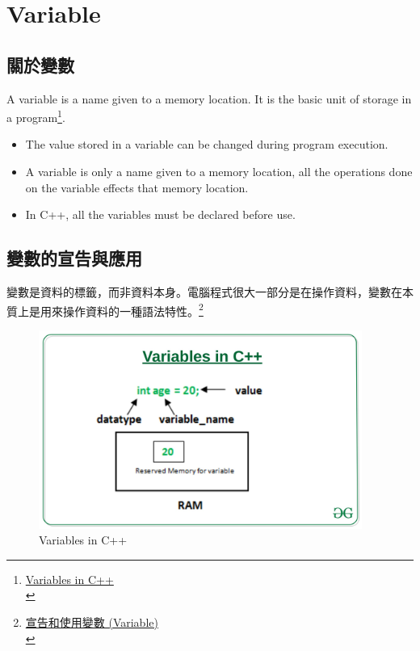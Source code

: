 \documentclass[a4paper,12pt]{article}
\begin{document}
\section{Variable}
\label{cpp_variables}
\subsection{關於變數}
\label{sec:org0c794d3}
A variable is a name given to a memory location. It is the basic unit of storage in a program\footnote{\href{https://www.geeksforgeeks.org/variables-in-c/}{Variables in C++}\\}.\\
\begin{itemize}
\item The value stored in a variable can be changed during program execution.\\
\item A variable is only a name given to a memory location, all the operations done on the variable effects that memory location.\\
\item In C++, all the variables must be declared before use.\\
\end{itemize}

\subsection{\label{VarDec}變數的宣告與應用}
\label{sec:org70830e7}
變數是資料的標籤，而非資料本身。電腦程式很大一部分是在操作資料，變數在本質上是用來操作資料的一種語法特性。\footnote{\href{https://michaelchen.tech/c-programming/variable/}{宣告和使用變數 (Variable)}\\}\\
\begin{figure}[htbp]
\centering
\includegraphics[width=400]{images/Variables-in-C-1.jpg}
\caption{\label{fig:vic}Variables in C++}
\end{figure}
\end{document}
